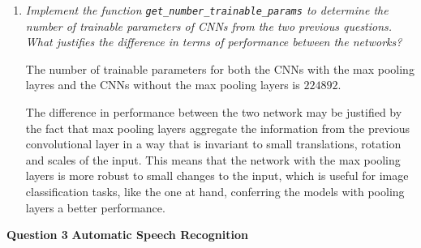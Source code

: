 \documentclass[12pt]{article}
\begin{document}
\begin{enumerate}[leftmargin=\labelsep]
          The training loss and validation accuracy for the best configuration without pooling layers are plotted in Figures \ref{fig:cnn-training-loss-0.01-0.7-0-sgd-true} and \ref{fig:cnn-validation-accuracy-0.01-0.7-0-sgd-true}, respectively.

          \begin{figure}[H]
              \centering
              
              \caption{Training loss as a function of the epoch number for $\eta = 0.01$.}
              \label{fig:cnn-training-loss-0.01-0.7-0-sgd-true}
          \end{figure}

          \begin{figure}[H]
              \centering
              
              \caption{Validation accuracy as a function of the epoch number for $\eta = 0.01$.}
              \label{fig:cnn-validation-accuracy-0.01-0.7-0-sgd-true}
          \end{figure}

    \item \textit{Implement the function \texttt{get\_number\_trainable\_params} to determine the number of trainable parameters of CNNs from the two previous questions. What justifies the difference in terms of performance between the networks?}

          \vspace{12pt}

          The number of trainable parameters for both the CNNs with the max pooling layres and the CNNs without the max pooling layers is $224892$.

          \vspace{12pt}

          The difference in performance between the two network may be justified by the fact that max pooling layers aggregate the information from the previous convolutional layer in a way that is invariant to small translations, rotation and scales of the input. This means that the network with the max pooling layers is more robust to small changes to the input, which is useful for image classification tasks, like the one at hand, conferring the models with pooling layers a better performance.

\end{enumerate}

\center\large{\textbf{Question 3}}
\center\textbf{Automatic Speech Recognition}
\end{document}
